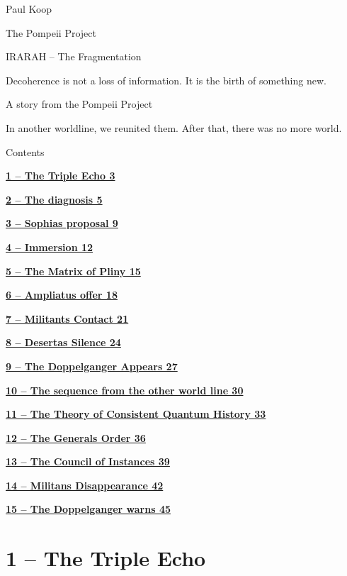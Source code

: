 \documentclass[
]{article}
\author{}
\date{}
\begin{document}
{
\setcounter{tocdepth}{3}
\tableofcontents
}
Paul Koop

The Pompeii Project

IRARAH -- The Fragmentation

Decoherence is not a loss of information. It is the birth of something new.

A story from the Pompeii Project

In another worldline, we reunited them. After that, there was no more world.

Contents

\hyperref[the-triple-echo]{\textbf{1 -- The Triple Echo 3}}

\hyperref[the-diagnosis]{\textbf{2 -- The diagnosis 5}}

\hyperref[sophias-proposal]{\textbf{3 -- Sophia\textquotesingle s proposal 9}}

\hyperref[immersion]{\textbf{4 -- Immersion 12}}

\hyperref[the-matrix-of-pliny]{\textbf{5 -- The Matrix of Pliny 15}}

\hyperref[ampliatus-offer]{\textbf{6 -- Ampliatus\textquotesingle{} offer 18}}

\hyperref[militants-contact]{\textbf{7 -- Militant\textquotesingle s Contact 21}}

\hyperref[desertas-silence]{\textbf{8 -- Deserta\textquotesingle s Silence 24}}

\hyperref[the-doppelganger-appears]{\textbf{9 -- The Doppelganger Appears 27}}

\hyperref[the-sequence-from-the-other-world-line]{\textbf{10 -- The sequence from the other world line 30}}

\hyperref[the-theory-of-consistent-quantum-history]{\textbf{11 -- The Theory of Consistent Quantum History 33}}

\hyperref[the-generals-order]{\textbf{12 -- The General\textquotesingle s Order 36}}

\hyperref[the-council-of-instances]{\textbf{13 -- The Council of Instances 39}}

\hyperref[militans-disappearance]{\textbf{14 -- Militans\textquotesingle{} Disappearance 42}}

\hyperref[the-doppelganger-warns]{\textbf{15 -- The Doppelganger warns 45}}

\section{1 -- The Triple Echo}\label{the-triple-echo}
\end{document}
